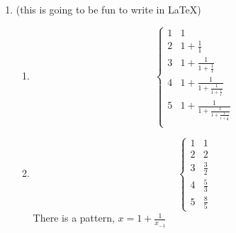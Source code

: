 \documentclass[]{article}
\begin{document}
\begin{enumerate}
\begin{align*}
                        &= \frac{1}{x^{3}+\sqrt[2]{x} } \leq \frac{1}{x^{3}}\\
                        \shortintertext{Because of the information in the box written at the top of the page, $\int_{1}^{\infty} \frac{1}{x^{3}+\sqrt[2]{x} } dx $ converges} 
                        \shortintertext{Also} 
                        &= \frac{1}{x^{3}+\sqrt[2]{x} } \leq \frac{1}{x^{\frac{1}{2}}}
                        \shortintertext{and, just like the first part, the information in the box tells us that this means $\int_{0}^{1} \frac{1}{x^{3}+\sqrt[2]{x} } dx $ converges.} 
                \end{align*}
                Because both parts of the integral can be compared against upper bounds which converge, due to the comparison test they also converge. And since both parts of the integral converge, the entire integral does. 

     \item 
             (this is going to be fun to write in LaTeX)
             \begin{enumerate}
                     \item 
                             \[ \begin{cases}
                                             1 & 1\\
                                             2 & 1 + \frac{1}{1} \\
                                             3 & 1 + \frac{1}{1+\frac{1}{1}} \\
                                             4 & 1 + \frac{1}{1+\frac{1}{1+\frac{1}{1}}} \\
                                             5 & 1 + \frac{1}{1+\frac{1}{1+\frac{1}{1+\frac{1}{1}}}} \\
                                     \end{cases}
                             \]
                     \item   
                             \[ \begin{cases}
                                             1 & 1\\
                                             2 & 2\\
                                             3 &  \frac{3}{2}\\
                                             4 &  \frac{5}{3}\\
                                             5 & \frac{8}{5}
                             \end{cases}
                             \]
                             There is a pattern, $x = 1 + \frac{1}{x_{-1}}$


\end{enumerate}
\end{enumerate}
\end{document}
